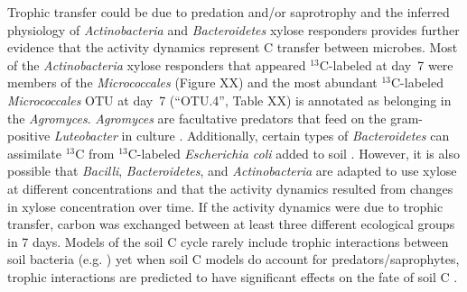 Trophic transfer could be due to predation and/or saprotrophy and the inferred
physiology of \textit{Actinobacteria} and \textit{Bacteroidetes} xylose
responders provides further evidence that the activity dynamics represent 
C transfer between microbes. Most of the \textit{Actinobacteria} xylose
responders that appeared $^{13}$C-labeled at day~7 were members of the
\textit{Micrococcales} (Figure XX) and the most abundant $^{13}$C-labeled
\textit{Micrococcales} OTU at day~7 (“OTU.4”, Table XX) is annotated as
belonging in the \textit{Agromyces}. \textit{Agromyces} are facultative
predators that feed on the gram-positive \textit{Luteobacter} in culture
\citep{16346402}. Additionally, certain types of \textit{Bacteroidetes} can
assimilate $^{13}$C from $^{13}$C-labeled \textit{Escherichia coli} added to
soil \citep{Lueders2006}. However, it is also
possible that \textit{Bacilli}, \textit{Bacteroidetes}, and
\textit{Actinobacteria} are adapted to use xylose at different concentrations
and that the activity dynamics resulted from changes in xylose concentration
over time. If the activity dynamics were due to trophic transfer, carbon was
exchanged between at least three different ecological groups in 7 days. Models
of the soil C cycle rarely include trophic interactions between soil bacteria
(e.g. \citep{Moore1988}) yet when soil C models do account for
predators/saprophytes, trophic interactions are predicted to have significant
effects on the fate of soil C \citep{Kaiser2014a}. 

